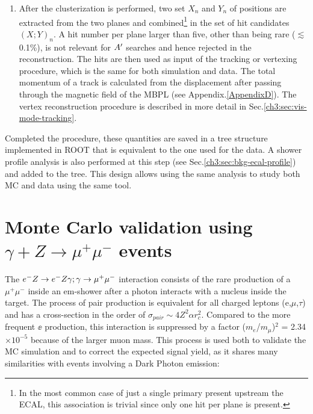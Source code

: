 \begin{enumerate}
\item After the clusterization is performed, two set $X_n$ and $Y_n$ of positions are extracted from the two planes and combined\footnote{In the most common case of just a single primary present upstream the ECAL, this association is trivial since only one hit per plane is present.} in the set of hit candidates $(X;Y)_n$. A hit number per plane larger than five, other than being rare ($\lesssim$0.1\%), is not relevant for $A'$ searches and hence rejected in the reconstruction. The hits are then used as input of the tracking or vertexing procedure, which is the same for both simulation and data. The total momentum of a track is calculated from the displacement after passing through the magnetic field of the MBPL (see Appendix.\ref{AppendixD}). The vertex reconstruction procedure is described in more detail in Sec.\ref{ch3:sec:vis-mode-tracking}.
\end{enumerate}

Completed the procedure, these quantities are saved in a tree structure implemented in ROOT \cite{root} that is equivalent to the one used for the data. A shower profile analysis is also performed at this step (see Sec.\ref{ch3:sec:bkg-ecal-profile}) and added to the tree. This design allows using the same analysis to study both MC and data using the same tool.

\section{Monte Carlo validation using $\gamma + Z \rightarrow \mu^+ \mu^-$ events}
\label{ch3:sec:dimuons}

The $e^- Z \to e^- Z \gamma; \gamma \to \mu^+ \mu^-$ interaction consists of the rare production of a $\mu^+\mu^-$ inside an em-shower after a photon interacts with a nucleus inside the target. The process of pair production is equivalent for all charged leptons (e,$\mu$,$\tau$) and has a cross-section in the order of $\sigma_{pair} \sim 4Z^2\alpha r^2_c$. Compared to the more frequent $\ee$ production, this interaction is suppressed by a factor ($m_e$/$m_{\mu}$)$^2$ = 2.34 $\times 10^{-5}$ because of the larger muon mass. This process is used both to validate the MC simulation and to correct the expected signal yield, as it shares many similarities with events involving a Dark Photon emission:

